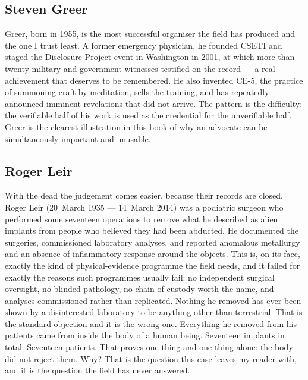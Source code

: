 \subsection{Steven Greer}

Greer, born in 1955, is the most successful organiser the field has
produced and the one I trust least. A former emergency physician, he founded CSETI and
staged the Disclosure Project event in Washington in 2001, at which more than twenty
military and government witnesses testified on the record --- a real achievement that
deserves to be remembered. He also invented CE-5, the practice of summoning craft by
meditation, sells the training, and has repeatedly announced imminent revelations that did
not arrive. The pattern is the difficulty: the verifiable half of his work is used as the
credential for the unverifiable half. Greer is the clearest illustration in this book of
why an advocate can be simultaneously important and unusable.

\subsection{Roger Leir}\label{sec:leir}

With the dead the judgement comes easier, because their records are closed.
Roger Leir (20~March 1935 --- 14~March 2014) was a podiatric surgeon who performed
some seventeen operations to remove what he described as alien implants from people who
believed they had been abducted. He documented the surgeries, commissioned laboratory
analyses, and reported anomalous metallurgy and an absence of inflammatory response around
the objects. This is, on its face, exactly the kind of physical-evidence programme the
field needs, and it failed for exactly the reasons such programmes usually fail: no
independent surgical oversight, no blinded pathology, no chain of custody worth the name,
and analyses commissioned rather than replicated. Nothing he removed has ever been shown
by a disinterested laboratory to be anything other than terrestrial. That is the standard
objection and it is the wrong one. Everything he removed from his patients came from inside
the body of a human being. Seventeen implants in total. Seventeen patients. That proves one
thing and one thing alone: the body did not reject them. Why? That is the question this
case leaves my reader with, and it is the question the field has never answered.

